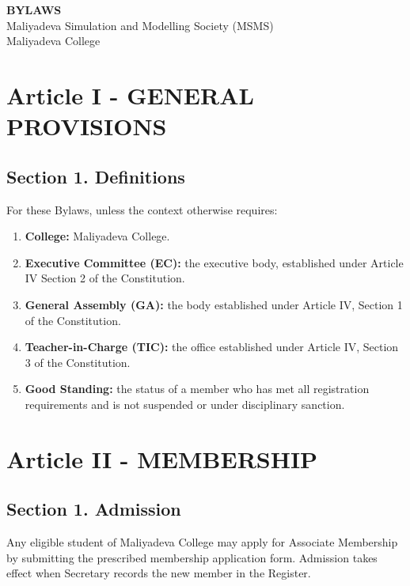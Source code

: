 \documentclass[a4paper]{article}
\begin{document}
\begin{center}
    \vspace{-1.5cm}
    {\LARGE\bfseries BYLAWS}\\[0.6em]
    {\large Maliyadeva Simulation and Modelling Society (MSMS)}\\[0.4em]
    {\normalsize Maliyadeva College}
\end{center}
\tableofcontents

\section*{Article I - GENERAL PROVISIONS}

\subsection*{Section 1. Definitions}
For these Bylaws, unless the context otherwise requires:
\begin{enumerate}
\item \textbf{College:} Maliyadeva College.
\item \textbf{Executive Committee (EC):} the executive body, established under Article IV Section 2 of the Constitution.
\item \textbf{General Assembly (GA):} the body established under Article IV, Section 1 of the Constitution.
\item \textbf{Teacher-in-Charge (TIC):} the office established under Article IV, Section 3 of the Constitution.
\item \textbf{Good Standing:} the status of a member who has met all registration requirements and is not suspended or under disciplinary sanction.
\end{enumerate}

\section*{Article II - MEMBERSHIP}

\subsection*{Section 1. Admission}
Any eligible student of Maliyadeva College may apply for Associate Membership by submitting the prescribed membership application form. Admission takes effect when Secretary records the new member in the Register.
\end{document}

